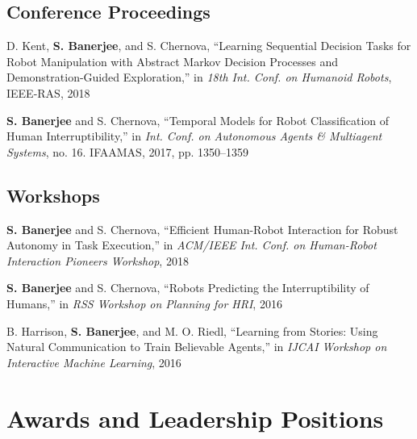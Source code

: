 \documentclass[letterpaper]{article}
\renewenvironment{itemize}{
  \begin{list}{}{
    \setlength{\leftmargin}{1.5em}
  }
}{
  \end{list}
}
\begin{document}
\subsection*{Conference Proceedings}

\begin{itemize}
  \item D. Kent, \textbf{S. Banerjee}, and S. Chernova, ``Learning Sequential Decision Tasks for Robot Manipulation with Abstract Markov Decision Processes and Demonstration-Guided Exploration,'' in \textit{18th Int. Conf. on Humanoid Robots}, IEEE-RAS, 2018

  \item \textbf{S. Banerjee} and S. Chernova, ``Temporal Models for Robot Classification of Human Interruptibility,'' in \textit{Int. Conf. on Autonomous Agents \& Multiagent Systems}, no. 16. IFAAMAS, 2017, pp. 1350--1359
\end{itemize}

\subsection*{Workshops}

\begin{itemize}
  \item \textbf{S. Banerjee} and S. Chernova, ``Efficient Human-Robot Interaction for Robust Autonomy in Task Execution,'' in \textit{ACM/IEEE Int. Conf. on Human-Robot Interaction Pioneers Workshop}, 2018

  \item \textbf{S. Banerjee} and S. Chernova, ``Robots Predicting the Interruptibility of Humans,'' in \textit{RSS Workshop on Planning for HRI}, 2016

  \item B. Harrison, \textbf{S. Banerjee}, and M. O. Riedl, ``Learning from Stories: Using Natural Communication to Train Believable Agents,'' in \textit{IJCAI Workshop on Interactive Machine Learning}, 2016
\end{itemize}

\section*{Awards and Leadership Positions}
\end{document}
